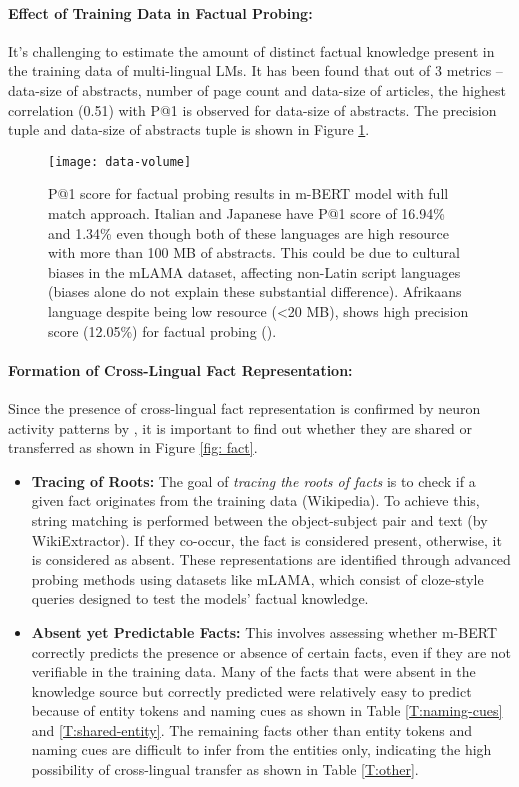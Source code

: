 \paragraph{Effect of Training Data in Factual Probing:} It's challenging to estimate the amount of distinct factual knowledge present in the training data of multi-lingual LMs. It has been found that out of 3 metrics -- data-size of abstracts, number of page count and data-size of articles, the highest correlation (0.51) with P@1 is observed for data-size of abstracts. The precision tuple and data-size of abstracts tuple is shown in Figure \ref{fig: data-volume}.

\begin{figure}[tbh]
	\centering
	\texttt{[image: data-volume]}
	\caption[P@1 score for factual probing results in m-BERT model with full match approach]{P@1 score for factual probing results in m-BERT model with full match approach. Italian and Japanese have P@1 score of 16.94\% and 1.34\% even though both of these languages are high resource with more than 100 MB of abstracts. This could be due to cultural biases in the mLAMA dataset, affecting non-Latin script languages (biases alone do not explain these substantial difference). Afrikaans language despite being low resource (\textless 20 MB), shows high precision score (12.05\%) for factual probing (\citet{zhao2024tracing}).}
	\label{fig: data-volume}
\end{figure}

\paragraph{Formation of Cross-Lingual Fact Representation:} Since the presence of cross-lingual fact representation is confirmed by neuron activity patterns by \citet{zhao2024tracing}, it is important to find out whether they are shared or transferred as shown in Figure \ref{fig: fact}. 
\begin{itemize}
	\item \textbf{Tracing of Roots:} The goal of \emph{tracing the roots of facts} is to check if a given fact originates from the training data (Wikipedia). To achieve this, string matching is performed between the object-subject pair and text (by WikiExtractor). If they co-occur, the fact is considered present, otherwise, it is considered as absent. These representations are identified through advanced probing methods using datasets like mLAMA, which consist of cloze-style queries designed to test the models' factual knowledge. 
	\item \textbf{Absent yet Predictable Facts:} This involves assessing whether m-BERT correctly predicts the presence or absence of certain facts, even if they are not verifiable in the training data. Many of the facts that were absent in the knowledge source but correctly predicted were relatively easy to predict because of entity tokens and naming cues as shown in Table \ref{T:naming-cues} and \ref{T:shared-entity}. The remaining facts other than entity tokens and naming cues are difficult to infer from the entities only, indicating the high possibility of cross-lingual transfer as shown in Table \ref{T:other}.
\end{itemize}

